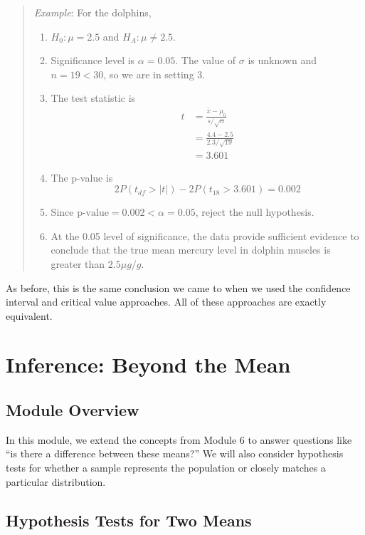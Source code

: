 \documentclass[
]{book}
\providecommand{\tightlist}{%
  \setlength{\itemsep}{0pt}\setlength{\parskip}{0pt}}
\begin{document}
\begin{quote}
\emph{Example}: For the dolphins,

\begin{enumerate}
\def\labelenumi{\arabic{enumi}.}
\tightlist
\item
  \(H_0: \mu = 2.5\) and \(H_A: \mu \ne 2.5\).
\item
  Significance level is \(\alpha=0.05\). The value of \(\sigma\) is unknown and \(n = 19 < 30\), so we are in setting 3.
\item
  The test statistic is \begin{align} t &= \frac{\bar{x}-\mu_0}{s/\sqrt{n}} \\ &= \frac{4.4-2.5}{2.3/\sqrt{19}} \\ &= 3.601 \end{align}
\item
  The p-value is \[2P(t_{df} > |t|) - 2P(t_{18} > 3.601) = 0.002\]
\item
  Since \(\text{p-value}=0.002 < \alpha=0.05\), reject the null hypothesis.
\item
  At the 0.05 level of significance, the data provide sufficient evidence to conclude that the true mean mercury level in dolphin muscles is greater than \(2.5\mu g/g\).
\end{enumerate}
\end{quote}

As before, this is the same conclusion we came to when we used the confidence interval and critical value approaches. All of these approaches are exactly equivalent.

\hypertarget{inference-beyond-the-mean}{%
\chapter{Inference: Beyond the Mean}\label{inference-beyond-the-mean}}

\hypertarget{module-overview-6}{%
\section{Module Overview}\label{module-overview-6}}

In this module, we extend the concepts from Module 6 to answer questions like ``is there a difference between these means?'' We will also consider hypothesis tests for whether a sample represents the population or closely matches a particular distribution.

\hypertarget{hypothesis-tests-for-two-means}{%
\section{Hypothesis Tests for Two Means}\label{hypothesis-tests-for-two-means}}
\end{document}
